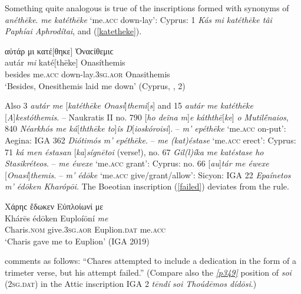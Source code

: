 Something quite analogous is true of the inscriptions formed with synonyms of \textit{anéthēke}. \textit{me katéthēke} `me.\textsc{acc} down-lay': Cyprus: \citet{Deecke1884} 1 \textit{Kás \emph{mi} katéthēke tâi Paphíai Aphrodítai}, and (\ref{katetheke}).

\begin{exe}
\ex αὐτάρ μι κατέ{[}θηκε{]} Ὀναϲίθεμιϲ\\
\gll autár \emph{mi} katé{[}thēke{]} Onasíthemis\\
besides me.\textsc{acc} down-lay.\textsc{3sg.aor} Onasithemis\\
\trans `Besides, Onesithemis laid me down' (Cyprus, \citealp{Deecke1884}, 2)
\label{katetheke}
\end{exe}

Also \citet{Deecke1884} 3 \textit{autár \emph{me}} {[}\textit{katéthēke Onasí}{]}\textit{themi}{[}\textit{s}{]} and 15 \textit{autár \emph{me} katéthēke} {[}\textit{A}{]}\textit{kestóthemis}. -- Naukratis II \citep{Gardner1888} no. 790 {[}\textit{ho deîna \emph{m}}{]}\textit{\emph{e} káththē}{[}\textit{ke}{]} \textit{o Mutilḗnaios}, 840 \textit{Néarkhós \emph{me} ká}{[}\textit{ththēke to}{]}\textit{îs D}{[}\textit{ioskóroisi}{]}. -- \textit{m' epéthēke} `me.\textsc{acc} on-put': Aegina: IGA 362 \textit{Diótimós \emph{m'} epéthēke}. -- \textit{me (kat)éstase} `me.\textsc{acc} erect': Cyprus: \citet{Deecke1884} 71 \textit{ká \emph{men} éstasan} {[}\textit{ka}{]}\textit{sígnētoi} (verse!), \citet[46]{Hoffmann1891} no. 67 \textit{Gil(l)íka \emph{me} katéstase ho Stasikréteos}. -- \textit{me éwexe} `me.\textsc{acc} grant': Cyprus: \citet[46]{Hoffmann1891} no. 66 {[}\textit{au}{]}\textit{tár \emph{me} éwexe} {[}\textit{Onasí}{]}\textit{the\-mis}. -- \textit{m' édōke} `me.\textsc{acc} give/grant/allow': Sicyon: IGA 22 \textit{Epaínetos \emph{m'} édōken Kharópōi}. The Boeotian inscription (\ref{failed}) deviates from the rule.

\begin{exe}
\ex Χάρηϲ ἔδωκεν Εὐπλοίωνί με\\
\gll Khárēs édōken Euploíōní \emph{me}\\
Charis.\textsc{nom} give.\textsc{3sg.aor} Euplion.\textsc{dat} me.\textsc{acc}\\
\trans `Charis gave me to Euplion' (IGA 2019)
\label{failed}
\end{exe}

\citet[56]{Roehl1882} comments as follows: ``Chares attempted to include a dedication in the form of a trimeter verse, but his attempt failed.'' (Compare also the \hyperlink{p349}{\emph{[p349]}} position of \textit{soi} (\textsc{2sg.dat}) in the Attic inscription IGA 2 \textit{tēndí \emph{soi} Thoúdēmos dídōsi}.)

